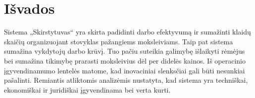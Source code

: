 \chapter{Išvados}

Sistema „Skirstytuvas“ yra skirta padidinti darbo efektyvumą ir sumažinti 
klaidų skaičių organizuojant stovyklas pažangiems moksleiviams. Taip pat 
sistema sumažina vykdytojų darbo krūvį. Tuo pačiu suteikia galimybę 
išlaikyti rėmėjus bei sumažina tikimybę prarasti moksleivius dėl per
didelės kainos. Iš operacinio įgyvendinamumo lentelės %
matome, kad inovaciniai slenksčiai gali būti nesunkiai pašalinti.
Remiantis atliktomis analizėmis nustatyta, kad sistema yra techniškai, 
ekonomiškai ir juridiškai įgyvendinama bei verta kurti.